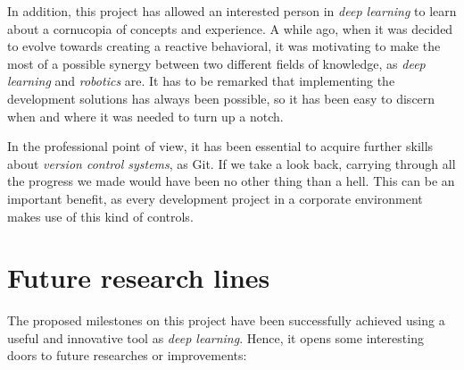 	
	In addition, this project has allowed an interested person in \emph{deep learning} to learn about a cornucopia of concepts and experience. A while ago, when it was decided to evolve towards creating a reactive behavioral, it was motivating to make the most of a possible synergy between two different fields of knowledge, as \emph{deep learning} and \emph{robotics} are. It has to be remarked that implementing the development solutions has always been possible, so it has been easy to discern when and where it was needed to turn up a notch.
	
	
	In the professional point of view, it has been essential to acquire further skills about \emph{version control systems}, as Git. If we take a look back, carrying through all the progress we made would have been no other thing than a hell. This can be an important benefit, as every development project in a corporate environment makes use of this kind of controls.

\section{Future research lines}
	The proposed milestones on this project have been successfully achieved using a useful and innovative tool as \emph{deep learning}. Hence, it opens some interesting doors to future researches or improvements:
	
